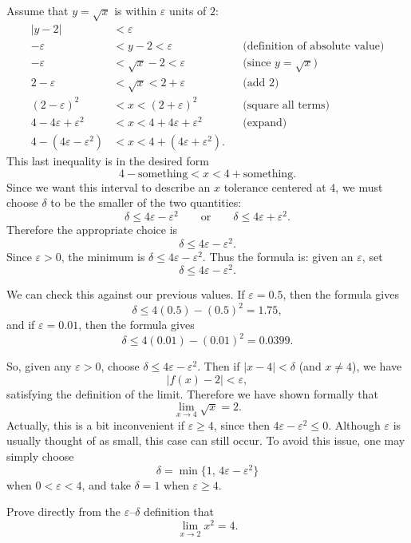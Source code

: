 \begin{example}
Assume that $y=\sqrt{x}$ is within $\varepsilon$ units of $2$:
\begin{align*}
|y-2| &< \varepsilon \\
-\varepsilon &< y-2 < \varepsilon
&& \text{(definition of absolute value)}\\
-\varepsilon &< \sqrt{x}-2 < \varepsilon
&& \text{(since } y=\sqrt{x}\text{)}\\
2-\varepsilon &< \sqrt{x} < 2+\varepsilon
&& \text{(add 2)}\\
(2-\varepsilon)^2 &< x < (2+\varepsilon)^2
&& \text{(square all terms)}\\
4-4\varepsilon+\varepsilon^2 &< x < 4+4\varepsilon+\varepsilon^2
&& \text{(expand)}\\
4-(4\varepsilon-\varepsilon^2) &< x < 4+(4\varepsilon+\varepsilon^2).
\end{align*}
This last inequality is in the desired form
\[
4-\text{something}<x<4+\text{something}.
\]
Since we want this interval to describe an $x$ tolerance centered at $4$, we
must choose $\delta$ to be the smaller of the two quantities:
\[
\delta\le 4\varepsilon-\varepsilon^2
\qquad \text{or} \qquad
\delta\le 4\varepsilon+\varepsilon^2.
\]
Therefore the appropriate choice is
\[
\delta\le 4\varepsilon-\varepsilon^2.
\]
Since $\varepsilon>0$, the minimum is $\delta \le 4\varepsilon-\varepsilon^2$.
Thus the formula is: given an $\varepsilon$, set
\[
\delta \le 4\varepsilon-\varepsilon^2.
\]

We can check this against our previous values.
If $\varepsilon=0.5$, then the formula gives
\[
\delta \le 4(0.5)-(0.5)^2=1.75,
\]
and if $\varepsilon=0.01$, then the formula gives
\[
\delta \le 4(0.01)-(0.01)^2=0.0399.
\]

So, given any $\varepsilon>0$, choose $\delta \le 4\varepsilon-\varepsilon^2$.
Then if $|x-4|<\delta$ (and $x\neq 4$), we have
\[
|f(x)-2|<\varepsilon,
\]
satisfying the definition of the limit. Therefore we have shown formally that
\[
\lim_{x\to 4}\sqrt{x}=2.
\]
Actually, this is a bit inconvenient if $\varepsilon\ge 4$, since then
$4\varepsilon-\varepsilon^2 \le 0$. Although $\varepsilon$ is usually thought
of as small, this case can still occur. To avoid this issue, one may simply choose
\[
\delta=\min\{1,\,4\varepsilon-\varepsilon^2\}
\]
when $0<\varepsilon<4$, and take $\delta=1$ when $\varepsilon\ge 4$.
\end{example}

\begin{example}
Prove directly from the $\varepsilon$--$\delta$ definition that
\[
\lim_{x\to 2}x^2=4.
\]
\end{example}

